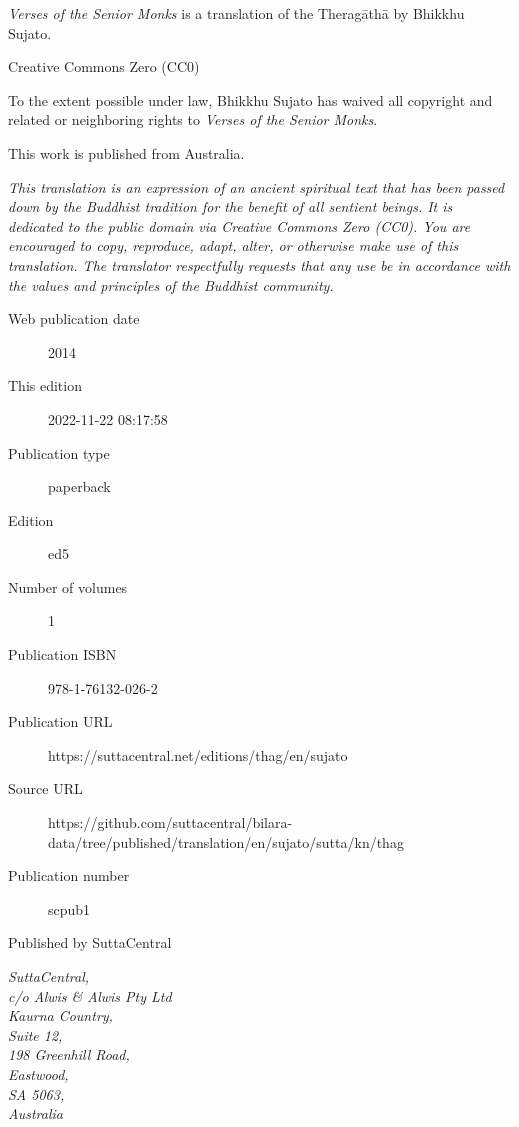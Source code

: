 \documentclass[12pt,openany]{book}%
\begin{document}
\begin{footnotesize}

\textit{Verses of the Senior Monks} is a translation of the Theragāthā by Bhikkhu Sujato.

\medskip

Creative Commons Zero (CC0)

To the extent possible under law, Bhikkhu Sujato has waived all copyright and related or neighboring rights to \textit{Verses of the Senior Monks}.

\medskip

This work is published from Australia.

\begin{center}
\textit{This translation is an expression of an ancient spiritual text that has been passed down by the Buddhist tradition for the benefit of all sentient beings. It is dedicated to the public domain via Creative Commons Zero (CC0). You are encouraged to copy, reproduce, adapt, alter, or otherwise make use of this translation. The translator respectfully requests that any use be in accordance with the values and principles of the Buddhist community.}
\end{center}

\medskip

\begin{description}
    \item[Web publication date] 2014
    \item[This edition] 2022-11-22 08:17:58
    \item[Publication type] paperback
    \item[Edition] ed5
    \item[Number of volumes] 1
    \item[Publication ISBN] 978-1-76132-026-2
    \item[Publication URL] https://suttacentral.net/editions/thag/en/sujato
    \item[Source URL] https://github.com/suttacentral/bilara-data/tree/published/translation/en/sujato/sutta/kn/thag
    \item[Publication number] scpub1
\end{description}

\medskip

Published by SuttaCentral

\medskip

\textit{SuttaCentral,\\
c/o Alwis \& Alwis Pty Ltd\\
Kaurna Country,\\
Suite 12,\\
198 Greenhill Road,\\
Eastwood,\\
SA 5063,\\
Australia}

\end{footnotesize}
\end{document}

